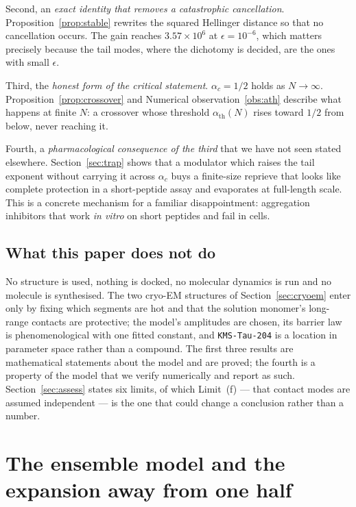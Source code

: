 \documentclass[11pt,reqno]{amsart}
\theoremstyle{plain}
\theoremstyle{definition}
\theoremstyle{remark}
\numberwithin{equation}{section}
\newcommand{\ac}{\alpha_c}
\newcommand{\ath}{\alpha_{\mathrm{th}}}
\newcommand{\lead}{\texttt{KMS-Tau-204}}
\begin{document}
Second, an \emph{exact identity that removes a catastrophic cancellation}. Proposition~\ref{prop:stable} rewrites the squared Hellinger distance so that no cancellation occurs. The gain reaches $3.57\times10^6$ at $\epsilon=10^{-6}$, which matters precisely because the tail modes, where the dichotomy is decided, are the ones with small $\epsilon$.

Third, the \emph{honest form of the critical statement}. $\ac=1/2$ holds as $N\to\infty$. Proposition~\ref{prop:crossover} and Numerical observation~\ref{obs:ath} describe what happens at finite $N$: a crossover whose threshold $\ath(N)$ rises toward $1/2$ from below, never reaching it.

Fourth, a \emph{pharmacological consequence of the third} that we have not seen stated elsewhere. Section~\ref{sec:trap} shows that a modulator which raises the tail exponent without carrying it across $\ac$ buys a finite-size reprieve that looks like complete protection in a short-peptide assay and evaporates at full-length scale. This is a concrete mechanism for a familiar disappointment: aggregation inhibitors that work \emph{in vitro} on short peptides and fail in cells.

\subsection{What this paper does not do}
No structure is used, nothing is docked, no molecular dynamics is run and no molecule is synthesised. The two cryo-EM structures of Section~\ref{sec:cryoem} enter only by fixing which segments are hot and that the solution monomer's long-range contacts are protective; the model's amplitudes are chosen, its barrier law is phenomenological with one fitted constant, and \lead{} is a location in parameter space rather than a compound. The first three results are mathematical statements about the model and are proved; the fourth is a property of the model that we verify numerically and report as such. Section~\ref{sec:assess} states six limits, of which Limit~(f) --- that contact modes are assumed independent --- is the one that could change a conclusion rather than a number.

\section{The ensemble model and the expansion away from one half}
\label{sec:model}
\end{document}
